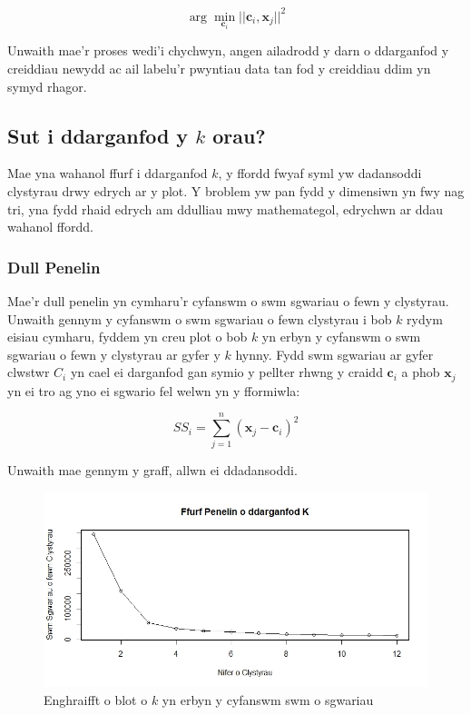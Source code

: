 \begin{equation}
\arg \min_{\mathbf{c}_i} ||\mathbf{c}_i, \mathbf{x}_j||^2
\end{equation}

Unwaith mae'r proses wedi'i chychwyn, angen ailadrodd y darn o ddarganfod y creiddiau newydd ac ail labelu'r pwyntiau data tan fod y creiddiau ddim yn symyd rhagor.

\subsection{Sut i ddarganfod y $k$ orau?}

Mae yna wahanol ffurf i ddarganfod $k$, y ffordd fwyaf syml yw dadansoddi clystyrau drwy edrych ar y plot. Y broblem yw pan fydd y dimensiwn yn fwy nag tri, yna fydd rhaid edrych am ddulliau mwy mathemategol, edrychwn ar ddau wahanol ffordd. 

\subsubsection{Dull Penelin}

Mae'r dull penelin yn cymharu'r cyfanswm o swm sgwariau o fewn y clystyrau. Unwaith gennym y cyfanswm o swm sgwariau o fewn clystyrau i bob $k$ rydym eisiau cymharu, fyddem yn creu plot o bob $k$ yn erbyn y cyfanswm o swm sgwariau o fewn y clystyrau ar gyfer y $k$ hynny. Fydd swm sgwariau ar gyfer clwstwr $C_{i}$ yn cael ei darganfod gan symio y pellter rhwng y craidd $\mathbf{c}_i$ a phob $\mathbf{x}_j$ yn ei tro ag yno ei sgwario fel welwn yn y fformiwla:

$$ SS_{i} = \sum_{j=1}^{n} (\mathbf{x}_{j}-\mathbf{c}_i)^{2} $$

Unwaith mae gennym y graff, allwn ei ddadansoddi. 

\begin{figure}[H]
\begin{center}
\includegraphics[width=0.5\linewidth]{../img/Dull_Penelin.jpeg}
\caption{Enghraifft o blot o $k$ yn erbyn y cyfanswm swm o sgwariau}
\label{fig:dullpenelin}
\end{center}
\end{figure}

